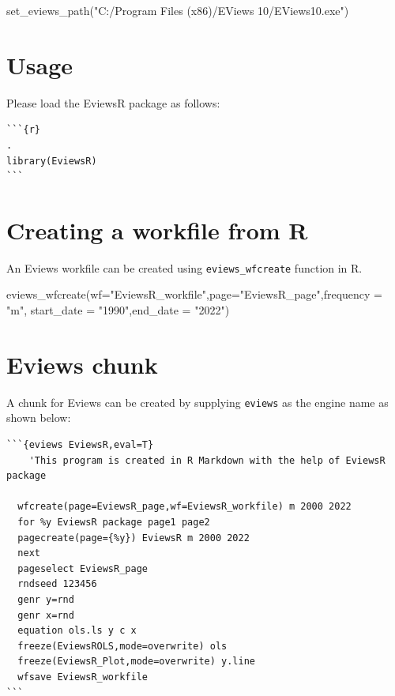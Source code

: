 \documentclass[
]{article}
\newenvironment{Shaded}{\begin{snugshade}}{\end{snugshade}}
\newcommand{\AttributeTok}[1]{\textcolor[rgb]{0.77,0.63,0.00}{#1}}
\newcommand{\FunctionTok}[1]{\textcolor[rgb]{0.00,0.00,0.00}{#1}}
\newcommand{\NormalTok}[1]{#1}
\newcommand{\StringTok}[1]{\textcolor[rgb]{0.31,0.60,0.02}{#1}}
\begin{document}
\begin{Shaded}
\begin{Highlighting}[]
\FunctionTok{set\_eviews\_path}\NormalTok{(}\StringTok{"C:/Program Files (x86)/EViews 10/EViews10.exe"}\NormalTok{)}
\end{Highlighting}
\end{Shaded}

\hypertarget{usage}{%
\section{Usage}\label{usage}}

Please load the EviewsR package as follows:

\begin{verbatim}
```{r}                                                                .
library(EviewsR)
```
\end{verbatim}

\hypertarget{creating-a-workfile-from-r}{%
\section{Creating a workfile from R}\label{creating-a-workfile-from-r}}

An Eviews workfile can be created using \texttt{eviews\_wfcreate} function in R.

\begin{Shaded}
\begin{Highlighting}[]
\FunctionTok{eviews\_wfcreate}\NormalTok{(}\AttributeTok{wf=}\StringTok{"EviewsR\_workfile"}\NormalTok{,}\AttributeTok{page=}\StringTok{"EviewsR\_page"}\NormalTok{,}\AttributeTok{frequency =} \StringTok{"m"}\NormalTok{,}
\AttributeTok{start\_date =} \StringTok{"1990"}\NormalTok{,}\AttributeTok{end\_date =} \StringTok{"2022"}\NormalTok{)}
\end{Highlighting}
\end{Shaded}

\hypertarget{eviews-chunk}{%
\section{Eviews chunk}\label{eviews-chunk}}

A chunk for Eviews can be created by supplying \texttt{eviews} as the engine name as shown below:

\begin{verbatim}
```{eviews EviewsR,eval=T} 
    'This program is created in R Markdown with the help of EviewsR package
  
  wfcreate(page=EviewsR_page,wf=EviewsR_workfile) m 2000 2022
  for %y EviewsR package page1 page2
  pagecreate(page={%y}) EviewsR m 2000 2022
  next
  pageselect EviewsR_page
  rndseed 123456
  genr y=rnd
  genr x=rnd
  equation ols.ls y c x
  freeze(EviewsROLS,mode=overwrite) ols
  freeze(EviewsR_Plot,mode=overwrite) y.line
  wfsave EviewsR_workfile
```  
\end{verbatim}
\end{document}
